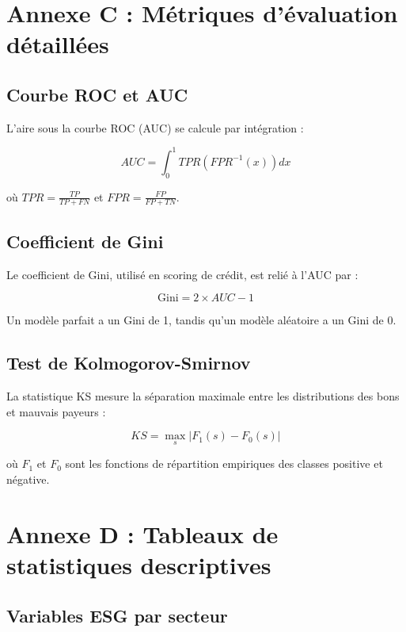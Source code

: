 \section{Annexe C : Métriques d'évaluation détaillées}

\subsection{Courbe ROC et AUC}

L'aire sous la courbe ROC (AUC) se calcule par intégration :

\begin{equation}
AUC = \int_0^1 TPR(FPR^{-1}(x)) dx
\end{equation}

où $TPR = \frac{TP}{TP + FN}$ et $FPR = \frac{FP}{FP + TN}$.

\subsection{Coefficient de Gini}

Le coefficient de Gini, utilisé en scoring de crédit, est relié à l'AUC par :

\begin{equation}
\text{Gini} = 2 \times AUC - 1
\end{equation}

Un modèle parfait a un Gini de 1, tandis qu'un modèle aléatoire a un Gini de 0.

\subsection{Test de Kolmogorov-Smirnov}

La statistique KS mesure la séparation maximale entre les distributions des bons et mauvais payeurs :

\begin{equation}
KS = \max_s |F_1(s) - F_0(s)|
\end{equation}

où $F_1$ et $F_0$ sont les fonctions de répartition empiriques des classes positive et négative.

\section{Annexe D : Tableaux de statistiques descriptives}

\subsection{Variables ESG par secteur}

